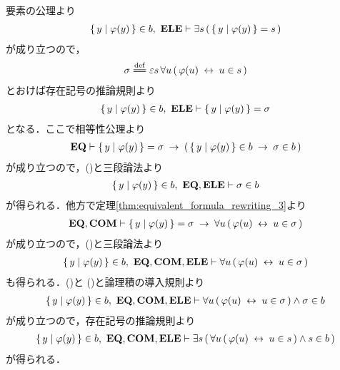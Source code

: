 	\begin{sketch}
		要素の公理より
		\begin{align}
			\left\{\, y \mid \varphi(y)\, \right\} \in b,\ \mbox{{\bf ELE}} \vdash 
			\exists s\, (\, \left\{\, y \mid \varphi(y)\, \right\} = s\, )
		\end{align}
		が成り立つので，
		\begin{align}
			\sigma \defeq 
			\varepsilon s\, \forall u\, (\, \varphi(u) \lrarrow u \in s\, )
		\end{align}
		とおけば存在記号の推論規則より
		\begin{align}
			\left\{\, y \mid \varphi(y)\, \right\} \in b,\ \mbox{{\bf ELE}} \vdash \left\{\, y \mid \varphi(y)\, \right\} = \sigma
			\label{fom:equivalent_formula_rewriting_9_1}
		\end{align}
		となる．ここで相等性公理より
		\begin{align}
			\mbox{{\bf EQ}} \vdash \left\{\, y \mid \varphi(y)\, \right\} = \sigma
			\hspace{0.25em}\rightarrow\hspace{0.25em} (\, \left\{\, y \mid \varphi(y)\, \right\} \in b \hspace{0.25em}\rightarrow\hspace{0.25em} \sigma \in b\, )
		\end{align}
		が成り立つので，()と三段論法より
		\begin{align}
			\left\{\, y \mid \varphi(y)\, \right\} \in b,\ \mbox{{\bf EQ}},\mbox{{\bf ELE}} \vdash \sigma \in b
			\label{fom:equivalent_formula_rewriting_9_2}
		\end{align}
		が得られる．他方で定理\ref{thm:equivalent_formula_rewriting_3}より
		\begin{align}
			\mbox{{\bf EQ}},\mbox{\bf COM} \vdash \left\{\, y \mid \varphi(y)\, \right\} = \sigma
			\hspace{0.25em}\rightarrow\hspace{0.25em} \forall u\, (\, \varphi(u) \hspace{0.25em}\leftrightarrow\hspace{0.25em} u \in \sigma\, )
		\end{align}
		が成り立つので，()と三段論法より
		\begin{align}
			\left\{\, y \mid \varphi(y)\, \right\} \in b,\ \mbox{{\bf EQ}},\mbox{\bf COM},\mbox{{\bf ELE}} \vdash
			\forall u\, (\, \varphi(u) \hspace{0.25em}\leftrightarrow\hspace{0.25em} u \in \sigma\, )
			\label{fom:equivalent_formula_rewriting_9_3}
		\end{align}
		も得られる．()と
		()と論理積の導入規則より
		\begin{align}
			\left\{\, y \mid \varphi(y)\, \right\} \in b,\ \mbox{{\bf EQ}},\mbox{\bf COM},\mbox{{\bf ELE}} \vdash
			\forall u\, (\, \varphi(u) \hspace{0.25em}\leftrightarrow\hspace{0.25em} u \in \sigma\, ) \wedge \sigma \in b
		\end{align}
		が成り立つので，存在記号の推論規則より
		\begin{align}
			\left\{\, y \mid \varphi(y)\, \right\} \in b,\ \mbox{{\bf EQ}},\mbox{\bf COM},\mbox{{\bf ELE}} \vdash
			\exists s\, (\, \forall u\, (\, \varphi(u) \hspace{0.25em}\leftrightarrow\hspace{0.25em} u \in s\, ) \wedge s \in b\, )
		\end{align}
		が得られる．
		\QED
	\end{sketch}
	
